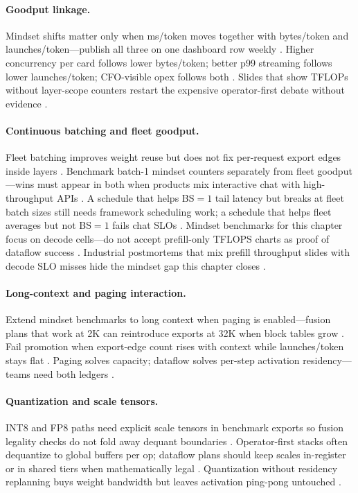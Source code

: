 \paragraph{Goodput linkage.}
Mindset shifts matter only when ms/token moves together with bytes/token and launches/token---publish all three on one dashboard row weekly \citep{patel2025llminference,taxbreak2026,memoryfloor2026}.
Higher concurrency per card follows lower bytes/token; better p99 streaming follows lower launches/token; CFO-visible opex follows both \citep{fan2025ellieenergyefficie}.
Slides that show TFLOPs without layer-scope counters restart the expensive operator-first debate without evidence \citep{dlbook}.

\paragraph{Continuous batching and fleet goodput.}
Fleet batching improves weight reuse but does not fix per-request export edges inside layers \citep{kwon2023vllm}.
Benchmark batch-1 mindset counters separately from fleet goodput---wins must appear in both when products mix interactive chat with high-throughput APIs \citep{patel2025llminference}.
A schedule that helps BS${=}1$ tail latency but breaks at fleet batch sizes still needs framework scheduling work; a schedule that helps fleet averages but not BS${=}1$ fails chat SLOs \citep{memoryfloor2026}.
Mindset benchmarks for this chapter focus on decode cells---do not accept prefill-only TFLOPS charts as proof of dataflow success \citep{taxbreak2026}.
Industrial postmortems that mix prefill throughput slides with decode SLO misses hide the mindset gap this chapter closes \citep{memoryfloor2026}.

\paragraph{Long-context and paging interaction.}
Extend mindset benchmarks to long context when paging is enabled---fusion plans that work at 2K can reintroduce exports at 32K when block tables grow \citep{kwon2023vllm,dao2022flashattention}.
Fail promotion when export-edge count rises with context while launches/token stays flat \citep{memoryfloor2026}.
Paging solves capacity; dataflow solves per-step activation residency---teams need both ledgers \citep{patel2025llminference}.

\paragraph{Quantization and scale tensors.}
INT8 and FP8 paths need explicit scale tensors in benchmark exports so fusion legality checks do not fold away dequant boundaries \citep{liu2024deepseekv3,yirage2026}.
Operator-first stacks often dequantize to global buffers per op; dataflow plans should keep scales in-register or in shared tiers when mathematically legal \citep{chen2020compilerbasedhardw}.
Quantization without residency replanning buys weight bandwidth but leaves activation ping-pong untouched \citep{memoryfloor2026}.

